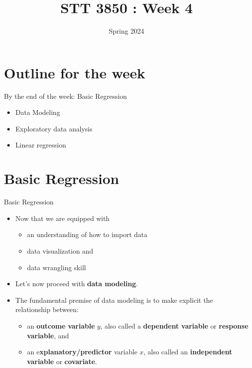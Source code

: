 \documentclass[
  ignorenonframetext,
]{beamer}
\title{STT 3850 : Week 4}
\author{Spring 2024}
\date{}
\institute{Appalachian State University}
\providecommand{\tightlist}{%
  \setlength{\itemsep}{0pt}\setlength{\parskip}{0pt}}
\begin{document}
\frame{\titlepage}

\hypertarget{outline-for-the-week}{%
\section{Outline for the week}\label{outline-for-the-week}}

\begin{frame}{By the end of the week: Basic Regression}
\protect\hypertarget{by-the-end-of-the-week-basic-regression}{}
\begin{itemize}
\tightlist
\item
  Data Modeling
\item
  Exploratory data analysis
\item
  Linear regression
\end{itemize}
\end{frame}

\hypertarget{basic-regression}{%
\section{Basic Regression}\label{basic-regression}}

\begin{frame}{Basic Regression}
\protect\hypertarget{basic-regression-1}{}
\begin{itemize}
\item
  Now that we are equipped with

  \begin{itemize}
  \tightlist
  \item
    an understanding of how to import data
  \item
    data visualization and
  \item
    data wrangling skill
  \end{itemize}
\item
  Let's now proceed with \textbf{data modeling}.
\item
  The fundamental premise of data modeling is to make explicit the
  relationship between:

  \begin{itemize}
  \tightlist
  \item
    an \textbf{outcome variable} \(y\), also called a \textbf{dependent
    variable} or \textbf{response variable}, and
  \item
    an e\textbf{xplanatory/predictor} variable \(x\), also called an
    \textbf{independent variable} or \textbf{covariate}.
  \end{itemize}
\end{itemize}
\end{frame}
\end{document}
